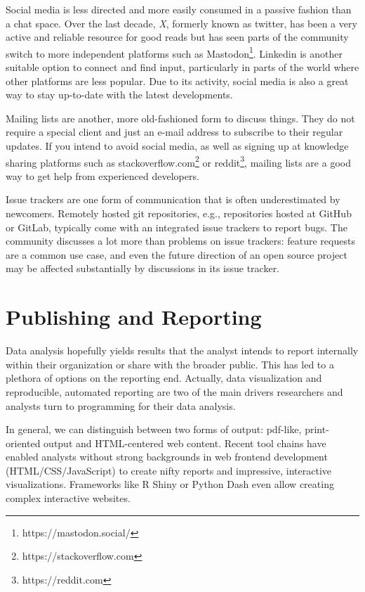 \documentclass[
  12pt,
  letterpaper,
]{krantz}
\begin{document}
Social media is less directed and more easily consumed in a passive
fashion than a chat space. Over the last decade, \emph{X}, formerly
known as twitter, has been a very active and reliable resource for good
reads but has seen parts of the community switch to more independent
platforms such as Mastodon\footnote{https://mastodon.social/}. Linkedin
is another suitable option to connect and find input, particularly in
parts of the world where other platforms are less popular. Due to its
activity, social media is also a great way to stay up-to-date with the
latest developments.

Mailing lists are another, more old-fashioned form to discuss things.
They do not require a special client and just an e-mail address to
subscribe to their regular updates. If you intend to avoid social media,
as well as signing up at knowledge sharing platforms such as
stackoverflow.com\footnote{https://stackoverflow.com}
or reddit\footnote{https://reddit.com}, mailing lists are a good way to
get help from experienced developers.

Issue trackers are one form of communication that is often
underestimated by newcomers. Remotely hosted git repositories, e.g.,
repositories hosted at GitHub or GitLab, typically come
with an integrated issue trackers to report bugs. The community
discusses a lot more than problems on issue trackers: feature requests
are a common use case, and even the future direction of an open source
project may be affected substantially by discussions in its issue
tracker.

\hypertarget{publishing-and-reporting}{%
\section{\texorpdfstring{Publishing and
Reporting}{Publishing and Reporting}}\label{publishing-and-reporting}}

Data analysis hopefully yields results that the analyst intends to
report internally within their organization or share with the broader
public. This has led to a plethora of options on the reporting end.
Actually, data visualization and reproducible, automated reporting are
two of the main drivers researchers and analysts turn to programming for
their data analysis.

In general, we can distinguish between two forms of output: pdf-like,
print-oriented output and HTML-centered web content. Recent tool chains
have enabled analysts without strong backgrounds in web frontend
development (HTML/CSS/JavaScript) to create nifty reports and
impressive, interactive visualizations. Frameworks like R Shiny or
Python Dash even allow creating complex interactive websites.
\end{document}
